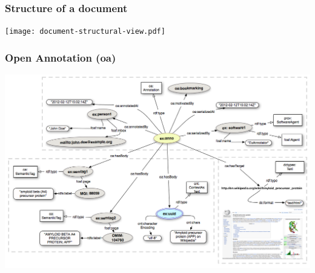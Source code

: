 \documentclass[10pt]{beamer}
\begin{document}
\begin{frame}
  \frametitle{Structure of a document}
  \centering
  \texttt{[image: document-structural-view.pdf]}
\end{frame}

\begin{frame}
  \frametitle{Open Annotation (oa)}
\begin{adjustwidth}{-3em}{-3em}
  \centering
  \includegraphics[width=1\linewidth]{Open-Annotation_CB_Bookmarking_and_Semantically_Tagging_A_webpage_spec20130128.png}
\end{adjustwidth}

\end{frame}
\end{document}
